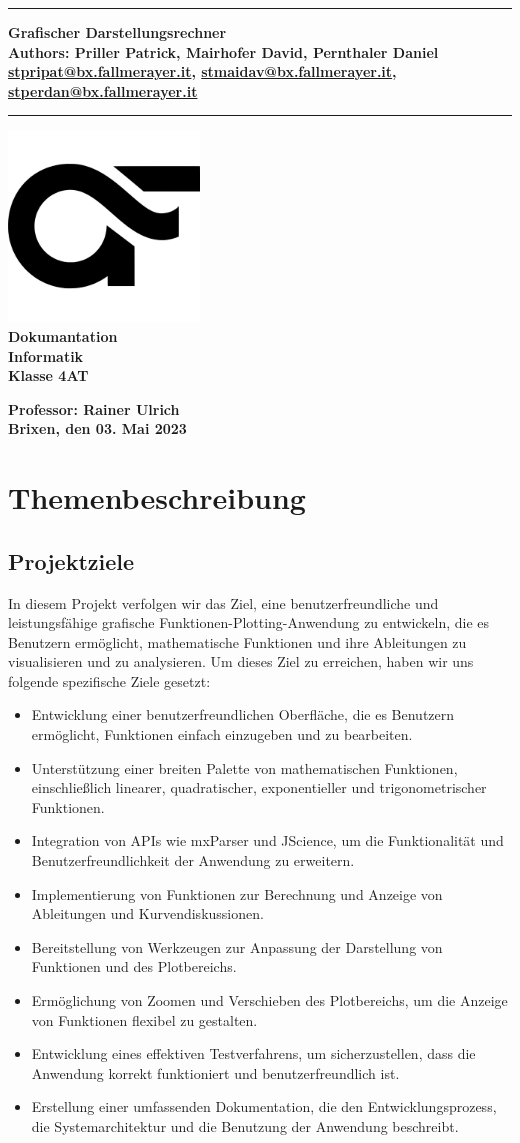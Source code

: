 \documentclass[a4paper]{article}
\newcommand{\CustomTitle}[9]{
    \thispagestyle{empty}
    \vspace*{\stretch{1}}
    {\parindent0cm \rule{\linewidth}{.7ex}}
    \begin{flushright}
        \vspace*{\stretch{1}}
        \sffamily\bfseries\huge
        #1\\
        \vspace*{\stretch{1}}
        \sffamily\bfseries\small
        #2\\
        \vspace*{\stretch{1}}
        \sffamily\bfseries\small
        #3
    \end{flushright}
    \rule{\linewidth}{.7ex}

    \vspace*{\stretch{1}}
    \begin{center}
        \includegraphics[width=2in]{Resources/logo.png} \\
        \vspace*{\stretch{1}}
        \textbf{\Large Dokumantation}\\

        \vspace*{\stretch{2}}
        \textbf{\large Informatik}\\
        \textbf{\large Klasse 4AT}

        \vspace*{\stretch{1}}
        \textbf{\large Professor: Rainer Ulrich}  \\[1mm]

        \vspace*{\stretch{1}}
        \textbf{\large Brixen, den 03. Mai 2023}\\
        \vspace*{\stretch{0.25}}
    \end{center}
}
\begin{document}
\CustomTitle
{Grafischer Darstellungsrechner}
{Authors: Priller Patrick, Mairhofer David, Pernthaler Daniel}
{\href{mailto:stpripat@bx.fallmerayer.it}{stpripat@bx.fallmerayer.it}, \href{mailto:stmaidav@bx.fallmerayer.it}{stmaidav@bx.fallmerayer.it}, \href{mailto:stperdan@bx.fallmayer.it}{stperdan@bx.fallmerayer.it}}

{Oberschulzentrum J. Ph. Fallmerayer}
{Brixen}
{\today}
{Rainer Ulrich}
{}

\clearpage

\lhead{}
\setcounter{page}{1}
\tableofcontents

\clearpage

\section{Themenbeschreibung}

\subsection{Projektziele}

In diesem Projekt verfolgen wir das Ziel, eine benutzerfreundliche und leistungsfähige grafische Funktionen-Plotting-Anwendung zu entwickeln, die es Benutzern ermöglicht, mathematische Funktionen und ihre Ableitungen zu visualisieren und zu analysieren. Um dieses Ziel zu erreichen, haben wir uns folgende spezifische Ziele gesetzt:

\begin{itemize}
	\item Entwicklung einer benutzerfreundlichen Oberfläche, die es Benutzern ermöglicht, Funktionen einfach einzugeben und zu bearbeiten.
	\item Unterstützung einer breiten Palette von mathematischen Funktionen, einschließlich linearer, quadratischer, exponentieller und trigonometrischer Funktionen.
	\item Integration von APIs wie mxParser und JScience, um die Funktionalität und Benutzerfreundlichkeit der Anwendung zu erweitern.
	\item Implementierung von Funktionen zur Berechnung und Anzeige von Ableitungen und Kurvendiskussionen.
	\item Bereitstellung von Werkzeugen zur Anpassung der Darstellung von Funktionen und des Plotbereichs.
	\item Ermöglichung von Zoomen und Verschieben des Plotbereichs, um die Anzeige von Funktionen flexibel zu gestalten.
	\item Entwicklung eines effektiven Testverfahrens, um sicherzustellen, dass die Anwendung korrekt funktioniert und benutzerfreundlich ist.
	\item Erstellung einer umfassenden Dokumentation, die den Entwicklungsprozess, die Systemarchitektur und die Benutzung der Anwendung beschreibt.
\end{itemize}
\end{document}
